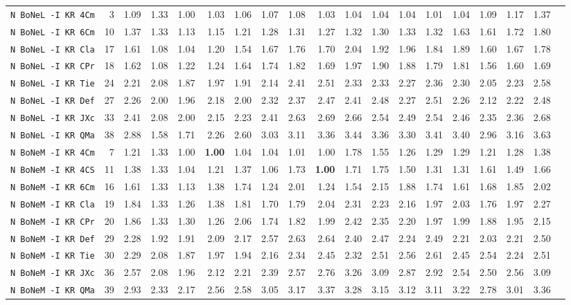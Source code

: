 \begin{tabular}{l | r @{~~} r | r@{~~}r@{~~}r@{~~}r@{~~}r@{~~}r@{~~}r@{~~}r@{~~}r@{~~}r@{~~}r@{~~}r@{~~}r@{~~}r@{~~}r@{~~}r|}
\verb+N BoNeL -I KR 4Cm+ & 3 & 1.09 & 1.33&1.00&1.03&1.06&1.07&1.08&1.03&1.04&1.04&1.04&1.01&1.04&1.09&1.17&1.37\\
\verb+N BoNeL -I KR 6Cm+ & 10 & 1.37 & 1.33&1.13&1.15&1.21&1.28&1.31&1.27&1.32&1.30&1.33&1.32&1.63&1.61&1.72&1.80\\
\verb+N BoNeL -I KR Cla+ & 17 & 1.61 & 1.08&1.04&1.20&1.54&1.67&1.76&1.70&2.04&1.92&1.96&1.84&1.89&1.60&1.67&1.78\\
\verb+N BoNeL -I KR CPr+ & 18 & 1.62 & 1.08&1.22&1.24&1.64&1.74&1.82&1.69&1.97&1.90&1.88&1.79&1.81&1.56&1.60&1.69\\
\verb+N BoNeL -I KR Tie+ & 24 & 2.21 & 2.08&1.87&1.97&1.91&2.14&2.41&2.51&2.33&2.33&2.27&2.36&2.30&2.05&2.23&2.58\\
\verb+N BoNeL -I KR Def+ & 27 & 2.26 & 2.00&1.96&2.18&2.00&2.32&2.37&2.47&2.41&2.48&2.27&2.51&2.26&2.12&2.22&2.48\\
\verb+N BoNeL -I KR JXc+ & 33 & 2.41 & 2.08&2.00&2.15&2.23&2.41&2.63&2.69&2.66&2.54&2.49&2.54&2.46&2.35&2.36&2.68\\
\verb+N BoNeL -I KR QMa+ & 38 & 2.88 & 1.58&1.71&2.26&2.60&3.03&3.11&3.36&3.44&3.36&3.30&3.41&3.40&2.96&3.16&3.63\\
\verb+N BoNeM -I KR 4Cm+ & 7 & 1.21 & 1.33&1.00&\textbf{1.00}&1.04&1.04&1.01&1.00&1.78&1.55&1.26&1.29&1.29&1.21&1.28&1.38\\
\verb+N BoNeM -I KR 4CS+ & 11 & 1.38 & 1.33&1.04&1.21&1.37&1.06&1.73&\textbf{1.00}&1.71&1.75&1.50&1.31&1.31&1.61&1.49&1.66\\
\verb+N BoNeM -I KR 6Cm+ & 16 & 1.61 & 1.33&1.13&1.38&1.74&1.24&2.01&1.24&1.54&2.15&1.88&1.74&1.61&1.68&1.85&2.02\\
\verb+N BoNeM -I KR Cla+ & 19 & 1.84 & 1.33&1.26&1.38&1.81&1.70&1.79&2.04&2.31&2.23&2.16&1.97&2.03&1.76&1.97&2.27\\
\verb+N BoNeM -I KR CPr+ & 20 & 1.86 & 1.33&1.30&1.26&2.06&1.74&1.82&1.99&2.42&2.35&2.20&1.97&1.99&1.88&1.95&2.15\\
\verb+N BoNeM -I KR Def+ & 29 & 2.28 & 1.92&1.91&2.09&2.17&2.57&2.63&2.64&2.40&2.47&2.24&2.49&2.21&2.03&2.21&2.50\\
\verb+N BoNeM -I KR Tie+ & 30 & 2.29 & 2.08&1.87&1.97&1.94&2.16&2.34&2.45&2.32&2.51&2.56&2.61&2.45&2.54&2.24&2.51\\
\verb+N BoNeM -I KR JXc+ & 36 & 2.57 & 2.08&1.96&2.12&2.21&2.39&2.57&2.76&3.26&3.09&2.87&2.92&2.54&2.50&2.56&3.09\\
\verb+N BoNeM -I KR QMa+ & 39 & 2.93 & 2.33&2.17&2.56&2.58&3.05&3.17&3.37&3.28&3.15&3.12&3.11&3.22&2.78&3.01&3.36\\

\end{tabular}
